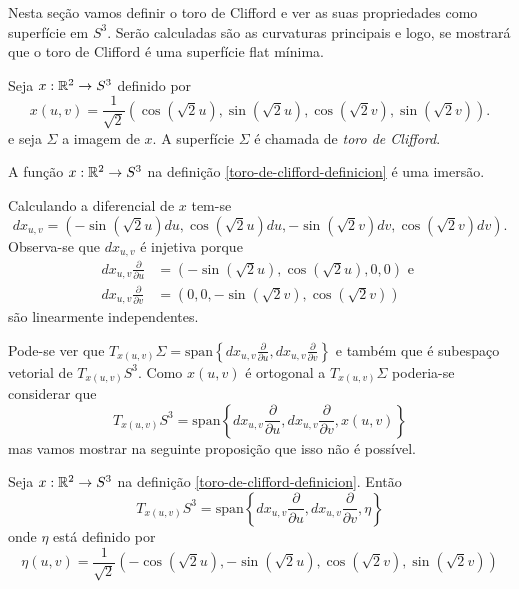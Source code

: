 Nesta seção vamos definir o toro de Clifford e ver as suas propriedades como superfície em $S^3$. Serão calculadas são as curvaturas principais e logo, se mostrará que o toro de Clifford é uma superfície flat mínima.

\begin{definicao}\label{toro-de-clifford-definicion}
	Seja
	$x: \mathbb R^2 \rightarrow S^3$
	definido por
	\begin{equation*}
	x(u,v) = \frac{1}{\sqrt{2}} \left(\cos(\sqrt{2} u), \sin(\sqrt{2} u), \cos(\sqrt{2} v), \sin(\sqrt{2} v)\right).
	\end{equation*}
	e seja $\Sigma$ a imagem de $x$. A superfície $\Sigma$ é chamada de \emph{toro de Clifford}.
\end{definicao}

\begin{proposicao}
	A função $x: \mathbb R^2 \rightarrow S^3$ na definição \ref{toro-de-clifford-definicion} é uma imersão.
\end{proposicao}

\begin{demonstracao}
	Calculando a diferencial de $x$ tem-se
	\begin{equation*}
	dx_{u,v} = \left(-\sin(\sqrt{2} u) du, \cos(\sqrt{2} u) du, -\sin(\sqrt{2} v) dv, \cos(\sqrt{2} v) dv\right).
	\end{equation*}
	Observa-se que $dx_{u,v}$ é injetiva porque
	\begin{align*}
	dx_{u,v} \frac{\partial}{\partial u} &= \left(-\sin(\sqrt{2} u), \cos(\sqrt{2} u), 0, 0\right) \text{ e }\\
	dx_{u,v} \frac{\partial}{\partial v} &= \left(0, 0, -\sin(\sqrt{2} v), \cos(\sqrt{2} v)\right)
	\end{align*}
	são linearmente independentes.
\end{demonstracao}
Pode-se ver que
$T_{x(u,v)} \Sigma = \text{span} \left\{dx_{u,v} \frac{\partial}{\partial u}, dx_{u,v} \frac{\partial}{\partial v}\right\}$
e também que é subespaço vetorial de
$T_{x(u,v)} S^3$.
Como $x(u,v)$ é ortogonal a $T_{x(u,v)} \Sigma$ poderia-se considerar que
\begin{equation*}
	T_{x(u,v)} S^3 = \text{span} \left\{dx_{u,v} \frac{\partial}{\partial u}, dx_{u,v} \frac{\partial}{\partial v}, x(u,v)\right\}
\end{equation*}
mas vamos mostrar na seguinte proposição que isso não é possível.

\begin{proposicao}
	Seja $x:\mathbb R^2 \rightarrow S^3$ na definição \ref{toro-de-clifford-definicion}. Então
	\begin{equation*}
		T_{x(u,v)} S^3 = \text{span} \left\{dx_{u,v} \frac{\partial}{\partial u}, dx_{u,v} \frac{\partial}{\partial v}, \eta\right\}
	\end{equation*}
	onde $\eta$ está definido por
	\begin{equation*}
		\eta(u,v) = \frac{1}{\sqrt{2}} \left(-\cos(\sqrt{2} u), -\sin(\sqrt{2} u), \cos(\sqrt{2} v), \sin(\sqrt{2} v)\right)
	\end{equation*}
\end{proposicao}

